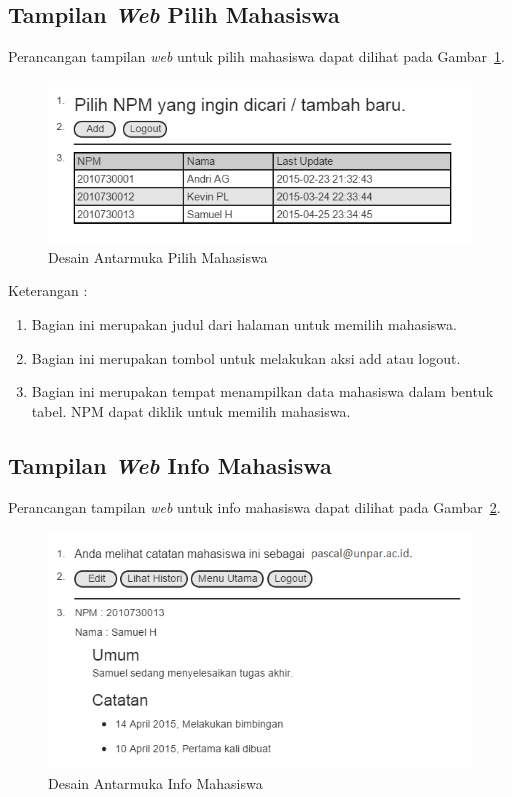 \subsection{Tampilan {\it Web} Pilih Mahasiswa}
Perancangan tampilan {\it web} untuk pilih mahasiswa dapat dilihat pada
Gambar~\ref{fig:pilihmahasiswa}.

\begin{figure}[ht]
\centering
\includegraphics[scale=0.9]{Gambar/pilihmahasiswa.png}
\caption[Desain Antarmuka Pilih Mahasiswa]{Desain Antarmuka Pilih Mahasiswa}
\label{fig:pilihmahasiswa}
\end{figure}

Keterangan :
\begin{enumerate}[(1)]
\item
Bagian ini merupakan judul dari halaman untuk memilih mahasiswa.
\item
Bagian ini merupakan tombol untuk melakukan aksi add atau logout.
\item
Bagian ini merupakan tempat menampilkan data mahasiswa dalam bentuk tabel. NPM
dapat diklik untuk memilih mahasiswa.
\end{enumerate}

\subsection{Tampilan {\it Web} Info Mahasiswa}
Perancangan tampilan {\it web} untuk info mahasiswa dapat dilihat pada Gambar~\ref{fig:infomahasiswa}.
\begin{figure}[ht]
\centering
\includegraphics[scale=0.9]{Gambar/infomahasiswa.png}
\caption[Desain Antarmuka Info Mahasiswa]{Desain Antarmuka Info Mahasiswa}
\label{fig:infomahasiswa}
\end{figure}

